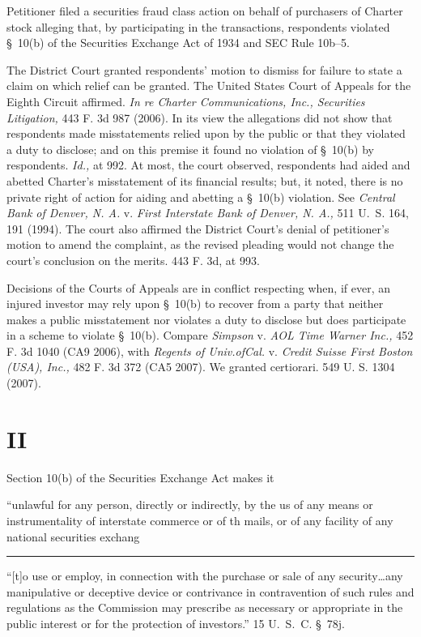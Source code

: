   Petitioner filed a securities fraud class action on behalf of purchasers of Charter stock alleging that, by participating in the transactions, respondents violated \S~10(b) of the Securities Exchange Act of 1934 and SEC Rule 10b--5.

  The District Court granted respondents' motion to dismiss for failure to state a claim on which relief can be granted. The United States Court of Appeals for the Eighth Circuit affirmed. \emph{In re Charter Communications, Inc., Securities Litigation,} 443 F. 3d 987 (2006). In its view the allegations did not show that respondents made misstatements relied upon by the public or that they violated a duty to disclose; and on this premise it found no violation of \S~10(b) by respondents. \emph{Id.,} at 992. At most, the court observed, respondents had aided and abetted Charter's misstatement of its financial results; but, it noted, there is no private right of action for aiding and abetting a \S~10(b) violation. See \emph{Central Bank of Denver, N. A.} v. \emph{First Interstate Bank of Den\newpage ver, N. A.,} 511 U.~S. 164, 191 (1994). The court also affirmed the District Court's denial of petitioner's motion to amend the complaint, as the revised pleading would not change the court's conclusion on the merits. 443 F. 3d, at 993.

  Decisions of the Courts of Appeals are in conflict respecting when, if ever, an injured investor may rely upon \S~10(b) to recover from a party that neither makes a public misstatement nor violates a duty to disclose but does participate in a scheme to violate \S~10(b). Compare \emph{Simpson} v. \emph{AOL Time Warner Inc.,} 452 F. 3d 1040 (CA9 2006), with \emph{Regents of Univ.ofCal.} v. \emph{Credit Suisse First Boston (USA), Inc.,} 482 F. 3d 372 (CA5 2007). We granted certiorari. 549 U. S. 1304 (2007).

\section{II}

  Section 10(b) of the Securities Exchange Act makes it

    ``unlawful for any person, directly or indirectly, by the us of any means or instrumentality of interstate commerce or of th mails, or of any facility of any national securities exchang

    \hrule

    ``[t]o use or employ, in connection with the purchase or sale of any security\dots any manipulative or deceptive device or contrivance in contravention of such rules and regulations as the Commission may prescribe as necessary or appropriate in the public interest or for the protection of investors.'' 15 U.~S.~C. \S~78j.

